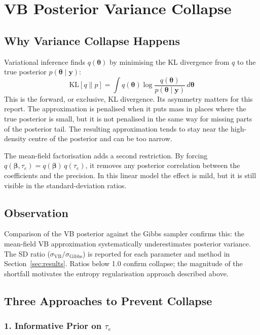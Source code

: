 \documentclass[11pt,a4paper]{article}
\begin{document}
\newpage
\section{VB Posterior Variance Collapse}
\label{app:vb-collapse}

\subsection*{Why Variance Collapse Happens}

Variational inference finds $q(\bm{\theta})$ by minimising the KL divergence from $q$ to the true posterior $p(\bm{\theta}\mid\bm{y})$:
\begin{equation}
  \mathrm{KL}[q \| p] = \int q(\bm{\theta}) \log \frac{q(\bm{\theta})}{p(\bm{\theta}\mid\bm{y})} \, d\bm{\theta}
\end{equation}
This is the forward, or exclusive, KL divergence. Its asymmetry matters for this report. The approximation is penalised when it puts mass in places where the true posterior is small, but it is not penalised in the same way for missing parts of the posterior tail. The resulting approximation tends to stay near the high-density centre of the posterior and can be too narrow.

The mean-field factorisation adds a second restriction. By forcing $q(\bm{\beta}, \tau_e) = q(\bm{\beta})\,q(\tau_e)$, it removes any posterior correlation between the coefficients and the precision. In this linear model the effect is mild, but it is still visible in the standard-deviation ratios.

\subsection*{Observation}

Comparison of the VB posterior against the Gibbs sampler confirms this: the mean-field VB approximation systematically underestimates posterior variance. The SD ratio ($\sigma_{\mathrm{VB}} / \sigma_{\mathrm{Gibbs}}$) is reported for each parameter and method in Section~\ref{sec:results}. Ratios below 1.0 confirm collapse; the magnitude of the shortfall motivates the entropy regularisation approach described above.

\subsection*{Three Approaches to Prevent Collapse}

\subsubsection*{1. Informative Prior on $\tau_e$}
\end{document}
